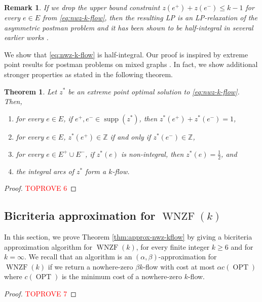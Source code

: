 \documentclass[11pt]{article}
\newtheorem{theorem}{Theorem}
\newtheorem{remark}{Remark}
\newcommand{\Z}{\mathbb{Z}}
\DeclareMathOperator{\supp}{supp}
\DeclareMathOperator{\opt}{OPT}
\begin{document}
\begin{remark}
If we drop the upper bound constraint $z(e^+)+z(e^-)\leq k-1$ for every $e\in E$ from \eqref{eq:nwz-k-flow}, then the resulting LP is an LP-relaxation of the asymmetric postman problem and it has been shown to be half-integral in several earlier works \cite{kappauf1979mixed, win1989windy, ralphs1993mixed, zaragoza2003postman}. 
\end{remark}

We show that \eqref{eq:nwz-k-flow} is half-integral. Our proof is inspired by extreme point results for postman problems on mixed graphs \cite{zaragoza2003postman}. In fact, we show additional stronger properties as stated in the following theorem.


\begin{theorem}\label{thm:APP_half_integral}
Let $z^*$ be an extreme point optimal solution to \eqref{eq:nwz-k-flow}. Then,
\begin{enumerate}[label={(\arabic*)}]
    \item for every $e\in E$, if $e^+,e^-\in \supp(z^*)$, then $z^*(e^+)+z^*(e^-)=1$, 
    \item for every $e\in E$, $z^*(e^+)\in \Z$ if and only if $z^*(e^-)\in \Z$, 
    \item for every $e\in E^+\cup E^-$, if $z^*(e)$ is non-integral, then $z^*(e)=\frac{1}{2}$, and 
    \item the integral arcs of $z^*$ form a $k$-flow.
\end{enumerate}
\end{theorem}
\begin{proof}\textcolor{red}{TOPROVE 6}\end{proof}


\subsection{Bicriteria approximation for $\operatorname{WNZF}(k)$}\label{sec:WNZF-approx}
In this section, we prove Theorem \ref{thm:approx-nwz-kflow} by giving a bicriteria approximation algorithm for $\operatorname{WNZF}(k)$, for every finite integer $k\geq 6$ and for $k=\infty$. We recall that an algorithm is an $(\alpha,\beta)$-approximation for $\operatorname{WNZF}(k)$ if we return a nowhere-zero $\beta k$-flow with cost at most $\alpha c(\opt)$ where $c(\opt)$ is the minimum cost of a nowhere-zero $k$-flow. 


\begin{proof}\textcolor{red}{TOPROVE 7}\end{proof}
\end{document}
